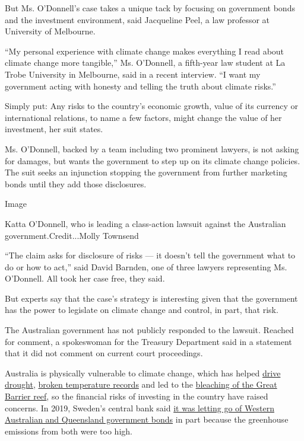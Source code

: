 But Ms. O'Donnell's case takes a unique tack by focusing on government
bonds and the investment environment, said Jacqueline Peel, a law
professor at University of Melbourne.

``My personal experience with climate change makes everything I read
about climate change more tangible,'' Ms. O'Donnell, a fifth-year law
student at La Trobe University in Melbourne, said in a recent interview.
``I want my government acting with honesty and telling the truth about
climate risks.''

Simply put: Any risks to the country's economic growth, value of its
currency or international relations, to name a few factors, might change
the value of her investment, her suit states.

Ms. O'Donnell, backed by a team including two prominent lawyers, is not
asking for damages, but wants the government to step up on its climate
change policies. The suit seeks an injunction stopping the government
from further marketing bonds until they add those disclosures.

Image

Katta O'Donnell, who is leading a class-action lawsuit against the
Australian government.Credit...Molly Townsend

``The claim asks for disclosure of risks --- it doesn't tell the
government what to do or how to act,'' said David Barnden, one of three
lawyers representing Ms. O'Donnell. All took her case free, they said.

But experts say that the case's strategy is interesting given that the
government has the power to legislate on climate change and control, in
part, that risk.

The Australian government has not publicly responded to the lawsuit.
Reached for comment, a spokeswoman for the Treasury Department said in a
statement that it did not comment on current court proceedings.

Australia is physically vulnerable to climate change, which has helped
\href{https://www.nytimes.com/2019/12/08/world/australia/water-drought-climate.html}{drive
drought},
\href{https://www.nytimes.com/2019/12/18/world/australia/record-heat.html}{broken
temperature records} and led to the
\href{https://www.nytimes.com/2020/04/06/world/australia/great-barrier-reefs-bleaching-dying.html}{bleaching
of the Great Barrier reef}, so the financial risks of investing in the
country have raised concerns. In 2019, Sweden's central bank said
\href{https://www.smh.com.au/business/markets/sweden-dumps-aussie-bonds-as-country-not-known-for-good-climate-work-20191114-p53agw.html}{it
was letting go of Western Australian and Queensland government bonds} in
part because the greenhouse emissions from both were too high.

